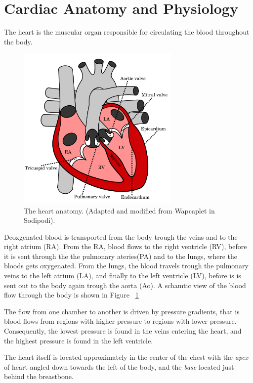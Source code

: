 \section{Cardiac Anatomy and Physiology}


The heart is the muscular organ responsible for circulating the blood
throughout the body.


\begin{figure}[htbp]
  \centering
    \includegraphics[width=0.7\textwidth]{chapters/introduction/figures/heart_anatomy.pdf}
\caption{The heart anatomy. (Adapted and modified from Wapcaplet in Sodipodi).}
\label{fig:heart_anatomy}
\end{figure}


Deoxgenated blood is transported from the body trough the veins and to
the right atrium (RA). From the RA, blood flows to the right ventricle
(RV), before it is sent through the the pulmonary ateries(PA) and to the
lungs, where the bloods gets oxygenated. From the lungs, the blood
travels trough the pulmonary veins to the left atrium (LA), and
finally to the left ventricle (LV), before is is sent out to the body
again trough the aorta (Ao). A schamtic view of the blood flow
through the body is shown in Figure ~\ref{fig:heart_anatomy}

The flow from one chamber to another is driven
by pressure gradients, that is blood flows from regions with higher
pressure to regions with lower pressure. Consequently, the lowest
pressure is found in the veins entering the heart, and the highest
pressure is found in the left ventricle.

The heart itself is located approximately in the center of the chest
with the \emph{apex} of heart angled down towards the left of the
body, and the \emph{base} located just behind the breastbone.



